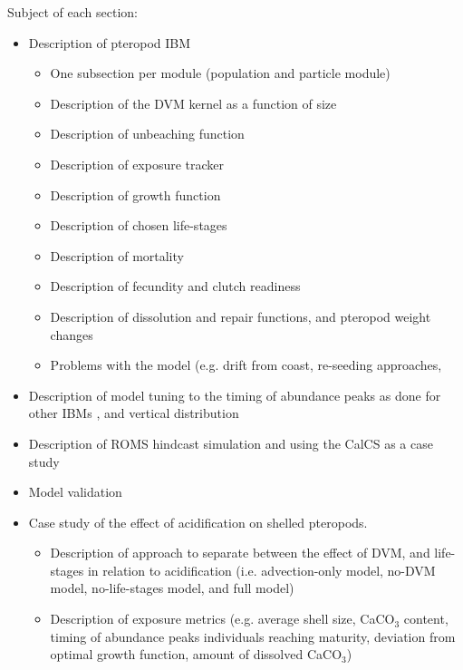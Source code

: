 Subject of each section:
\begin{itemize}
    \item Description of pteropod IBM
        \begin{itemize}
            \item One subsection per module (population and particle module) \citep{Erguler2018Modules}
            \item Description of the DVM kernel as a function of size \citep{Bianchi2013ImportanceDVM,Bednarsek2015VerticalDistribution,Murphy2016UpwardSwimming,Chang2012SwimmingSpeedSize,Byrne1984SettlingSpeed,Bergan2017SwimmingSinkingSpeeds}
            \item Description of unbeaching function \citep{Delandmeter2019Unbeaching}
            \item Description of exposure tracker \citep{Bednarsek2017ExposureHistory}
            \item Description of growth function \citep{Wang2017Lifecycle,Somers1988}
            \item Description of chosen life-stages \citep{Thabet2015Lifestages,Howes2014Lab}
            \item Description of mortality \citep{Bednarsek2016CumulativeEffects}
            \item Description of fecundity and clutch readiness \citep{Paranjape1968egg,Manno2016EggsAcidification,Bednarsek2016CumulativeEffects}
            \item Description of dissolution and repair functions, and pteropod weight changes \citep{Bednarsek2014CalcificationDissolution,Comeau2010RepairRates}
            \item Problems with the model (e.g. drift from coast, re-seeding approaches, 
        \end{itemize}
    \item Description of model tuning to the timing of abundance peaks as done for other IBMs \citep[e.g. ][]{Miller1998CalanusIBM}, and vertical distribution
    \item Description of ROMS hindcast simulation and using the CalCS as a case study
    \item Model validation
    
    
    \item Case study of the effect of acidification on shelled pteropods.
    \begin{itemize}
        \item Description of approach to separate between the effect of DVM, and life-stages in relation to acidification (i.e. advection-only model, no-DVM model, no-life-stages model, and full model)
        
        \item Description of exposure metrics (e.g. average shell size, CaCO$_3$ content, timing of abundance peaks individuals reaching maturity, deviation from optimal growth function, amount of dissolved CaCO$_3$)
    \end{itemize}
    
    
\end{itemize}
